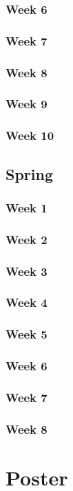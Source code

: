 \documentclass[letterpaper,10pt,serif,draftclsnofoot,onecolumn,compsoc,titlepage]{IEEEtran}
\begin{document}
\subsubsection{Week 6}
\subsubsection{Week 7}
\subsubsection{Week 8}
\subsubsection{Week 9}
\subsubsection{Week 10}
\subsection{Spring}
\subsubsection{Week 1}
\subsubsection{Week 2}
\subsubsection{Week 3}
\subsubsection{Week 4}
\subsubsection{Week 5}
\subsubsection{Week 6}
\subsubsection{Week 7}
\subsubsection{Week 8}
\section{Poster}
\end{document}
